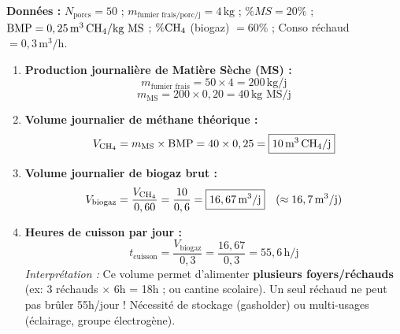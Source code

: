 \documentclass[11pt]{article}
\begin{document}
\begin{corrige}
\textbf{Données :} $N_{\text{porcs}} = 50$ ; $m_{\text{fumier frais/porc/j}} = 4\,\text{kg}$ ; $\%MS = 20\%$ ; $\text{BMP} = 0,25\,\text{m}^3\,\ce{CH4}/\text{kg MS}$ ; $\%\ce{CH4}$ (biogaz) $= 60\%$ ; Conso réchaud $= 0,3\,\text{m}^3/\text{h}$.

\begin{enumerate}
    \item \textbf{Production journalière de Matière Sèche (MS) :}
    \[ m_{\text{fumier frais}} = 50 \times 4 = 200\,\text{kg/j} \]
    \[ m_{\text{MS}} = 200 \times 0,20 = \boxed{40\,\text{kg MS/j}} \]

    \item \textbf{Volume journalier de méthane théorique :}
    \[ V_{\ce{CH4}} = m_{\text{MS}} \times \text{BMP} = 40 \times 0,25 = \boxed{10\,\text{m}^3\,\ce{CH4}/\text{j}} \]

    \item \textbf{Volume journalier de biogaz brut :}
    \[ V_{\text{biogaz}} = \frac{V_{\ce{CH4}}}{0,60} = \frac{10}{0,6} = \boxed{16,67\,\text{m}^3/\text{j}} \quad (\approx 16,7\,\text{m}^3/\text{j}) \]

    \item \textbf{Heures de cuisson par jour :}
    \[ t_{\text{cuisson}} = \frac{V_{\text{biogaz}}}{0,3} = \frac{16,67}{0,3} = \boxed{55,6\,\text{h/j}} \]
    \textit{Interprétation :} Ce volume permet d'alimenter \textbf{plusieurs foyers/réchauds} (ex: 3 réchauds $\times$ 6h = 18h ; ou cantine scolaire). Un seul réchaud ne peut pas brûler 55h/jour ! Nécessité de stockage (gasholder) ou multi-usages (éclairage, groupe électrogène).
\end{enumerate}
\end{corrige}
\end{document}
